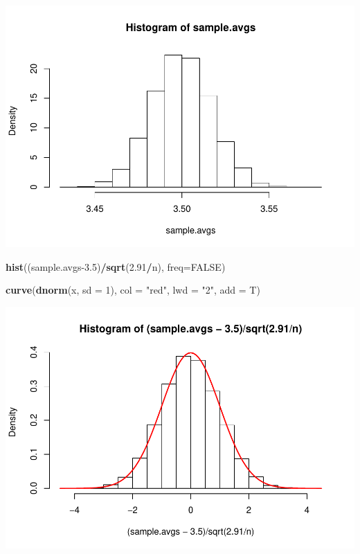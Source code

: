 \documentclass[
]{book}
\newenvironment{Shaded}{\begin{snugshade}}{\end{snugshade}}
\newcommand{\DataTypeTok}[1]{\textcolor[rgb]{0.13,0.29,0.53}{#1}}
\newcommand{\DecValTok}[1]{\textcolor[rgb]{0.00,0.00,0.81}{#1}}
\newcommand{\FloatTok}[1]{\textcolor[rgb]{0.00,0.00,0.81}{#1}}
\newcommand{\KeywordTok}[1]{\textcolor[rgb]{0.13,0.29,0.53}{\textbf{#1}}}
\newcommand{\NormalTok}[1]{#1}
\newcommand{\OperatorTok}[1]{\textcolor[rgb]{0.81,0.36,0.00}{\textbf{#1}}}
\newcommand{\OtherTok}[1]{\textcolor[rgb]{0.56,0.35,0.01}{#1}}
\newcommand{\StringTok}[1]{\textcolor[rgb]{0.31,0.60,0.02}{#1}}
\begin{document}
\includegraphics{Metrics_files/figure-latex/unnamed-chunk-14-1.pdf}

\begin{Shaded}
\begin{Highlighting}[]
\KeywordTok{hist}\NormalTok{((sample.avgs}\FloatTok{-3.5}\NormalTok{)}\OperatorTok{/}\KeywordTok{sqrt}\NormalTok{(}\FloatTok{2.91}\OperatorTok{/}\NormalTok{n), }\DataTypeTok{freq=}\OtherTok{FALSE}\NormalTok{)}


\KeywordTok{curve}\NormalTok{(}\KeywordTok{dnorm}\NormalTok{(x, }\DataTypeTok{sd =} \DecValTok{1}\NormalTok{), }
      \DataTypeTok{col =} \StringTok{"red"}\NormalTok{, }
      \DataTypeTok{lwd =} \StringTok{"2"}\NormalTok{, }
      \DataTypeTok{add =}\NormalTok{ T)}
\end{Highlighting}
\end{Shaded}

\includegraphics{Metrics_files/figure-latex/unnamed-chunk-14-2.pdf}
\end{document}
